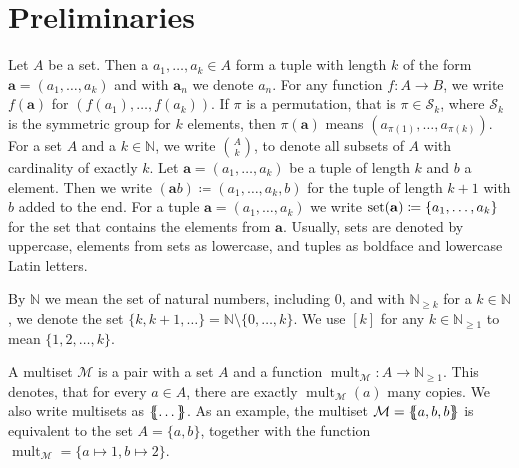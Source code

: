 \section{Preliminaries}
\label{sec:Preliminaries}

Let $A$ be a set.
Then a $a_1,\dots, a_k\in A$ form a tuple with length $k$ of the form $\mathbf a=(a_1,\dots,a_k)$ and with $\mathbf a_n$ we denote $a_n$.
For any function $f:A\to B$, we write $f(\mathbf a)$ for $(f(a_1),\dots,f(a_k))$.
If $\pi$ is a permutation, that is $\pi\in \mathcal S_k$, where $\mathcal S_k$ is the symmetric group for $k$ elements, then $\pi(\mathbf a)$ means $(a_{\pi(1)},\dots,a_{\pi(k)})$.
For a set $A$ and a $k\in \mathbb N$, we write $\binom{A}{k}$, to denote all subsets of $A$ with cardinality of exactly $k$.
Let $\mathbf a=(a_1,\dots,a_k)$ be a tuple of length $k$ and $b$ a element.
Then we write $(\mathbf ab)\coloneqq(a_1,\dots,a_k,b)$ for the tuple of length $k+1$ with $b$ added to the end.
For a tuple $\mathbf a=(a_1,\dots,a_k)$ we write $\operatorname{set}(\mathbf a)\coloneqq\{a_1,\dots,a_k\}$ for the set that contains the elements from $\mathbf a$.
Usually, sets are denoted by uppercase, elements from sets as lowercase, and tuples as boldface and lowercase Latin letters.

By $\mathbb N$ we mean the set of natural numbers, including $0$, and with $\mathbb N_{\geq k}$ for a $k\in \mathbb N$, we denote the set $\{k,k+1,\dots\}=\mathbb N \setminus \{0,\dots,k\}$.
We use $[k]$ for any $k\in \mathbb N_{\geq 1}$ to mean $\{1,2,\dots, k\}$.

A multiset $\mathcal M$ is a pair with a set $A$ and a function $\operatorname{mult}_{\mathcal M}:A\to \mathbb N_{\geq 1}$.
This denotes, that for every $a\in A$, there are exactly $\operatorname{mult}_{\mathcal M}(a)$ many copies.
We also write multisets as $\left\{\kern-.35em\left\{\dots\right\}\kern-.35em\right\}$.
As an example, the multiset $\mathcal M = \left\{\kern-.35em\left\{a, b, b\right\}\kern-.35em\right\}$ is equivalent to the set $A=\{a,b\}$, together with the function $\operatorname{mult}_{\mathcal M}=\{a\mapsto 1, b\mapsto 2\}$.

